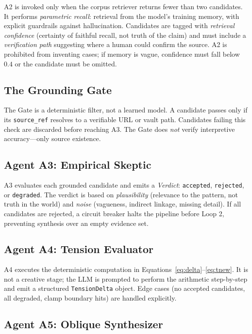 \documentclass[10pt,twocolumn]{article}
\begin{document}
A2 is invoked only when the corpus retriever returns fewer than two candidates. It performs \emph{parametric recall}: retrieval from the model's training memory, with explicit guardrails against hallucination. Candidates are tagged with \emph{retrieval confidence} (certainty of faithful recall, not truth of the claim) and must include a \emph{verification path} suggesting where a human could confirm the source. A2 is prohibited from inventing cases; if memory is vague, confidence must fall below $0.4$ or the candidate must be omitted.

\subsection{The Grounding Gate}

The Gate is a deterministic filter, not a learned model. A candidate passes only if its \texttt{source\_ref} resolves to a verifiable URL or vault path. Candidates failing this check are discarded before reaching A3. The Gate does \emph{not} verify interpretive accuracy---only source existence.

\subsection{Agent A3: Empirical Skeptic}

A3 evaluates each grounded candidate and emits a \emph{Verdict}: \texttt{accepted}, \texttt{rejected}, or \texttt{degraded}. The verdict is based on \emph{plausibility} (relevance to the pattern, not truth in the world) and \emph{noise} (vagueness, indirect linkage, missing detail). If all candidates are rejected, a circuit breaker halts the pipeline before Loop 2, preventing synthesis over an empty evidence set.

\subsection{Agent A4: Tension Evaluator}

A4 executes the deterministic computation in Equations~\eqref{eq:delta}--\eqref{eq:tnew}. It is not a creative stage; the LLM is prompted to perform the arithmetic step-by-step and emit a structured \texttt{TensionDelta} object. Edge cases (no accepted candidates, all degraded, clamp boundary hits) are handled explicitly.

\subsection{Agent A5: Oblique Synthesizer}
\end{document}
